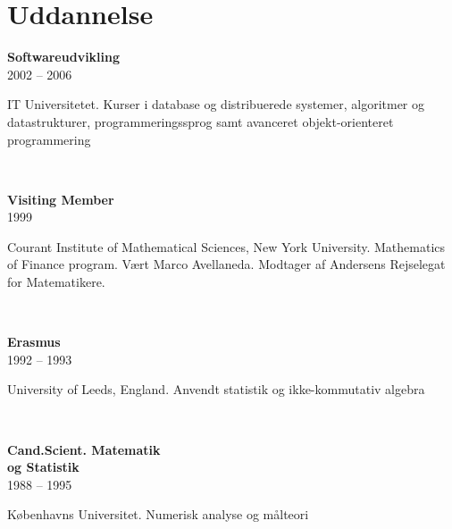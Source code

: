 \documentclass[10pt, a4paper]{article}
\begin{document}
\section{Uddannelse}
\begin{Row}%
  \begin{Cell}{1}
    \textbf{Softwareudvikling} \\[1ex]
    2002 -- 2006 %
  \end{Cell}
  \begin{Cell}{3}
    IT Universitetet. Kurser i database og distribuerede systemer, algoritmer og
    datastrukturer, programmeringssprog samt avanceret objekt-orienteret
    programmering
  \end{Cell}
\end{Row}
\\[0.5cm]
\begin{Row}%
  \begin{Cell}{1}
    \textbf{Visiting Member} \\[1ex]
    1999
  \end{Cell}
  \begin{Cell}{3}
    Courant Institute of Mathematical Sciences, New York University. Mathematics
    of Finance program. Vært Marco Avellaneda. Modtager af Andersens Rejselegat
    for Matematikere.
  \end{Cell}
\end{Row}
\\[0.5cm]
\begin{Row}%
  \begin{Cell}{1}
    \textbf{Erasmus} \\[1ex]
    1992 -- 1993 %
  \end{Cell}
  \begin{Cell}{3}
    University of Leeds, England. Anvendt statistik og ikke-kommutativ algebra
  \end{Cell}
\end{Row}
\\[0.5cm]
\begin{Row}%
  \begin{Cell}{1}
    \textbf{Cand.Scient. Matematik \\ og Statistik} \\[1ex]
    1988 -- 1995 %
  \end{Cell}
  \begin{Cell}{3}
    Københavns Universitet. Numerisk analyse og målteori
  \end{Cell}
\end{Row}
\end{document}
